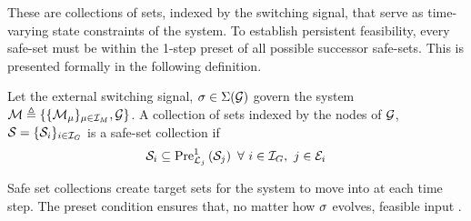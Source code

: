  These are collections of sets, indexed by the switching signal, that serve as time-varying state constraints of the system. To establish persistent feasibility, every safe-set must be within the 1-step preset of all possible successor safe-sets. This is presented formally in the following definition.
\begin{definition}
Let the external switching signal, $\ss\in\Sigma(\graph)$ govern the system $\modes\triangleq\{\{\mode{\modeidx}\}_{\modeidx\in\idxset{\nummodes}}, \graph\}$. A collection of sets indexed by the nodes of $\graph$, $\mathcal{S}=\{\mathcal{S}_{i}\}_{i\in\idxset{\gnumnodes}}$ is a safe-set collection if
$$\mathcal{S}_{i}\subseteq\Pre[\gnodelabel{j}][1]{\mathcal{S}_{j}}\ \forall\ i\in\idxset{\gnumnodes},\ j\in \gnodeedges{i}$$
\end{definition}
Safe set collections create target sets for the system to move into at each time step. The preset condition ensures that, no matter how $\ss$ evolves,  feasible input .
